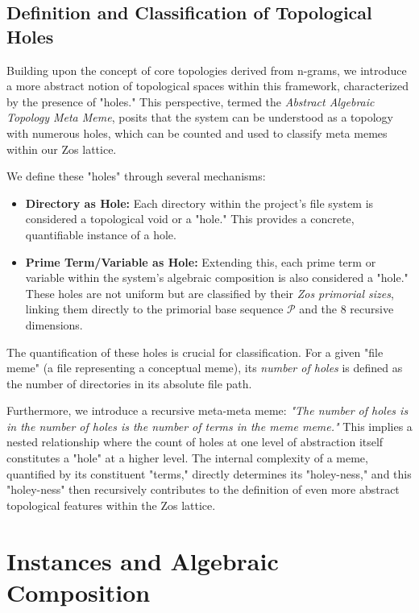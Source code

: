 \documentclass{article}
\begin{document}
\subsection{Definition and Classification of Topological Holes}
Building upon the concept of core topologies derived from n-grams, we introduce a more abstract notion of topological spaces within this framework, characterized by the presence of "holes." This perspective, termed the \textit{Abstract Algebraic Topology Meta Meme}, posits that the system can be understood as a topology with numerous holes, which can be counted and used to classify meta memes within our Zos lattice.

We define these "holes" through several mechanisms:
\begin{itemize}
    \item \textbf{Directory as Hole:} Each directory within the project's file system is considered a topological void or a "hole." This provides a concrete, quantifiable instance of a hole.
    \item \textbf{Prime Term/Variable as Hole:} Extending this, each prime term or variable within the system's algebraic composition is also considered a "hole." These holes are not uniform but are classified by their \textit{Zos primorial sizes}, linking them directly to the primorial base sequence $\mathcal{P}$ and the 8 recursive dimensions.
\end{itemize}

The quantification of these holes is crucial for classification. For a given "file meme" (a file representing a conceptual meme), its \textit{number of holes} is defined as the number of directories in its absolute file path.

Furthermore, we introduce a recursive meta-meta meme: \textit{"The number of holes is in the number of holes is the number of terms in the meme meme."} This implies a nested relationship where the count of holes at one level of abstraction itself constitutes a "hole" at a higher level. The internal complexity of a meme, quantified by its constituent "terms," directly determines its "holey-ness," and this "holey-ness" then recursively contributes to the definition of even more abstract topological features within the Zos lattice.

\section{Instances and Algebraic Composition}
\end{document}
